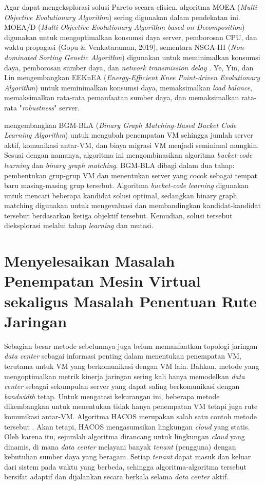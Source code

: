 Agar dapat mengeksplorasi solusi Pareto secara efisien, algoritma MOEA (\textit{Multi-Objective Evolutionary Algorithm}) sering digunakan dalam pendekatan ini. MOEA/D (\textit{Multi-Objective Evolutionary Algorithm based on Decomposition}) digunakan untuk mengoptimalkan konsumsi daya server, pemborosan CPU, dan waktu propagasi (Gopu \& Venkataraman, 2019), sementara NSGA-III (\textit{Non-dominated Sorting Genetic Algorithm}) digunakan untuk meminimalkan konsumsi daya, pemborosan sumber daya, dan \textit{network transmission delay} \citep{Gopu2023}. Ye, Yin, dan Lin mengembangkan EEKnEA (\textit{Energy-Efficient Knee Point-driven Evolutionary Algorithm}) untuk meminimalkan konsumsi daya, memaksimalkan \textit{load balance}, memaksimalkan rata-rata pemanfaatan sumber daya, dan memaksimalkan rata-rata "\textit{robustness}" server. 

\citet{Tao2016} mengembangkan BGM-BLA (\textit{Binary Graph Matching-Based Bucket Code Learning Algorithm}) untuk mengubah penempatan VM sehingga jumlah server aktif, komunikasi antar-VM, dan biaya migrasi VM menjadi seminimal mungkin. Sesuai dengan namanya, algoritma ini mengombinasikan algoritma \textit{bucket-code learning} dan \textit{binary graph matching}. BGM-BLA dibagi dalam dua tahap: pembentukan grup-grup VM dan menentukan server yang cocok sebagai tempat baru masing-masing grup tersebut. Algoritma \textit{bucket-code learning} digunakan untuk mencari beberapa kandidat solusi optimal, sedangkan binary graph matching digunakan untuk mengevaluasi dan membandingkan kandidat-kandidat tersebut berdasarkan ketiga objektif tersebut. Kemudian, solusi tersebut dieksplorasi melalui tahap \textit{learning} dan mutasi.


\section{Menyelesaikan Masalah Penempatan Mesin Virtual sekaligus Masalah Penentuan Rute Jaringan}
Sebagian besar metode sebelumnya juga belum memanfaatkan topologi jaringan \textit{data center} sebagai informasi penting dalam menentukan penempatan VM, terutama untuk VM yang berkomunikasi dengan VM lain. Bahkan, metode yang mengoptimalkan metrik kinerja jaringan sering kali hanya memodelkan \textit{data center} sebagai sekumpulan server yang dapat saling berkomunikasi dengan \textit{bandwidth} tetap. Untuk mengatasi kekurangan ini, beberapa metode dikembangkan untuk menentukan tidak hanya penempatan VM tetapi juga rute komunikasi antar-VM. Algoritma HACOS merupakan salah satu contoh metode tersebut \citep{AlharabeRakroukiAljohani2022}. Akan tetapi, HACOS mengasumsikan lingkungan \textit{cloud} yang statis. Oleh karena itu, sejumlah algoritma dirancang untuk lingkungan \textit{cloud} yang dinamis, di mana \textit{data center} melayani banyak \textit{tenant} (pengguna) dengan kebutuhan sumber daya yang beragam. Setiap \textit{tenant} dapat masuk dan keluar dari sistem pada waktu yang berbeda, sehingga algoritma-algoritma tersebut bersifat adaptif dan dijalankan secara berkala selama \textit{data center} aktif.

